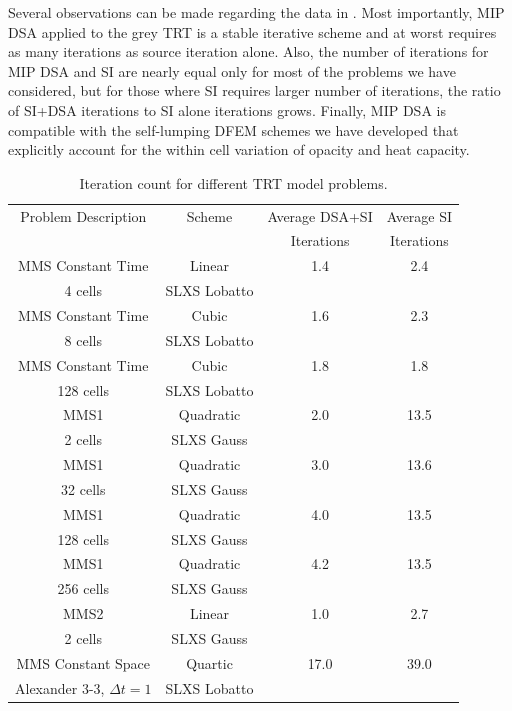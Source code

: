 Several observations can be made regarding the data in .  
Most importantly, MIP DSA applied to the grey TRT is a stable iterative scheme and at worst requires as many iterations as source iteration alone.
Also, the number of iterations for MIP DSA and SI are nearly equal only for most of the problems we have considered, but for those where SI requires larger number of iterations, the ratio of SI+DSA iterations to SI alone iterations grows.
Finally, MIP DSA is compatible with the self-lumping DFEM schemes we have developed that explicitly account for the within cell variation of opacity and heat capacity.

\begin{table}[!htp]
\centering
\caption{Iteration count for different TRT model problems.}
\begin{tabular}{|c|c|c|c|}
\hline
Problem Description & Scheme & Average DSA+SI & Average SI \\
{}									&				 &  Iterations & Iterations  \\
\hline
MMS Constant Time & Linear  & 1.4 & 2.4 \\
4 cells 					& SLXS Lobatto & {} & {} \\
\hline
MMS Constant Time	 & Cubic 			 & 1.6 & 2.3 \\
8 cells 						& SLXS Lobatto & {} & {} \\
\hline
MMS Constant Time	 & Cubic 				 & 1.8 & 1.8 \\
128 cells 					& SLXS Lobatto & {} & {} \\
\hline
MMS1 						& Quadratic 		& 2.0 & 13.5 \\
2 cells 				& SLXS Gauss 		& {}  & {} \\
\hline
MMS1 						& Quadratic 	& 3.0 & 13.6 \\
32 cells 				& SLXS Gauss 	& {} & {} \\
\hline
MMS1	 				& Quadratic  & 4.0 & 13.5 \\
128 cells 		& SLXS Gauss & {} & {} \\
\hline
MMS1 					& Quadratic		& 4.2 & 13.5 \\
256 cells 		& SLXS Gauss 	& {} & {} \\
\hline
MMS2 						& Linear	 & 1.0 & 2.7 \\
2 cells 					& SLXS Gauss & {} & {} \\
\hline
MMS Constant Space 									& Quartic 				 & 17.0 & 39.0 \\
Alexander 3-3, $\Delta t=1$					& SLXS Lobatto 			& {}  & {} \\

\end{tabular}
\end{table}
